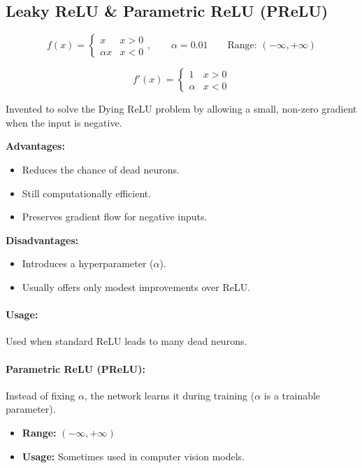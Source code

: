 \subsection{Leaky ReLU \& Parametric ReLU (PReLU)}

\begin{equation}
f(x) = \begin{cases} x & x > 0 \\ \alpha x & x < 0 \end{cases}, \qquad \alpha = 0.01 \qquad \text{Range: } (-\infty, +\infty)
\end{equation}

\begin{equation}
f'(x) = \begin{cases} 1 & x > 0 \\ \alpha & x < 0 \end{cases}
\end{equation}

\leakyreluplot

Invented to solve the Dying ReLU problem by allowing a small, non-zero gradient when the input is negative.

\begin{advbox}
\textbf{Advantages:}
\begin{itemize}
    \item Reduces the chance of dead neurons.
    \item Still computationally efficient.
    \item Preserves gradient flow for negative inputs.
\end{itemize}

\tcbline

\textbf{Disadvantages:}
\begin{itemize}
    \item Introduces a hyperparameter ($\alpha$).
    \item Usually offers only modest improvements over ReLU.
\end{itemize}
\end{advbox}

\paragraph{Usage:} Used when standard ReLU leads to many dead neurons.

\paragraph{Parametric ReLU (PReLU):} Instead of fixing $\alpha$, the network learns it during training ($\alpha$ is a trainable parameter).
\begin{itemize}
    \item \textbf{Range:} $(-\infty, +\infty)$
    \item \textbf{Usage:} Sometimes used in computer vision models.
\end{itemize}

